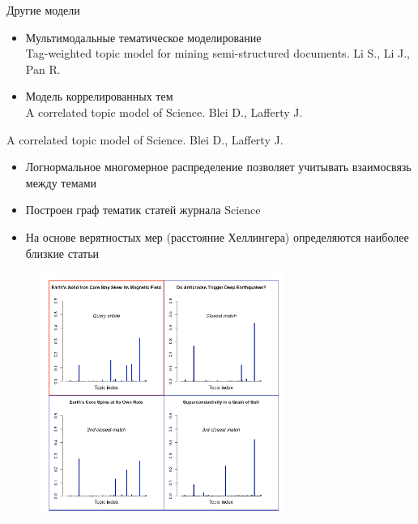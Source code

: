 \documentclass{beamer}
\begin{document}
\begin{frame}{Другие модели}
\begin{itemize}
\item Мультимодальные тематическое моделирование\\
Tag-weighted topic model for mining semi-structured documents. Li S., Li J., Pan R. 
\item Модель коррелированных тем\\
A correlated topic model of Science. Blei D., Lafferty J. 
\end{itemize}

\end{frame}

\begin{frame}{A correlated topic model of Science. Blei D., Lafferty J.}
\begin{itemize}
\item Логнормальное многомерное распределение позволяет учитывать взаимосвязь между темами
\item Построен граф тематик статей журнала Science
\item На основе верятностых мер (расстояние Хеллингера) определяются наиболее близкие статьи
\end{itemize}

\end{frame}

\begin{frame}
\begin{figure}
\includegraphics[height=8cm]{topmod4.jpg}
\end{figure}
\end{frame}
\end{document}
